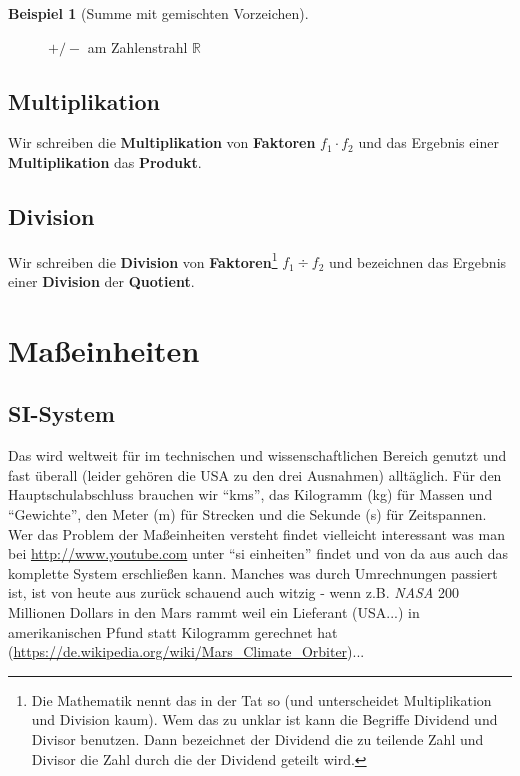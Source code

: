 \documentclass[a4paper]{book}%
\newcommand{\youtube}{\url{http://www.youtube.com}\xspace}
\theoremstyle{definition}
\newtheorem{beispiel}{Beispiel}
\begin{document}
\begin{beispiel}[Summe mit gemischten Vorzeichen]
\begin{figure}[H]
      \caption{$+/-$ am Zahlenstrahl $\mathbb{R}$}\label{fig:zahlenstrahlSumme01}
    \end{figure}
\end{beispiel}



\section{Multiplikation}

Wir schreiben die \textbf{Multiplikation} von \textbf{Faktoren} $f_1 \cdot f_2$ und das Ergebnis einer \textbf{Multiplikation} das \textbf{Produkt}.


\section{Division}

Wir schreiben die \textbf{Division} von \textbf{Faktoren}\footnote{Die Mathematik nennt das in der Tat so (und unterscheidet Multiplikation und Division kaum). Wem das zu unklar ist kann die Begriffe Dividend und Divisor benutzen. Dann bezeichnet der Dividend die zu teilende Zahl und Divisor die Zahl durch die der Dividend geteilt wird.} $f_1 \div f_2$ und bezeichnen das Ergebnis einer \textbf{Division} der \textbf{Quotient}.


\chapter{Maßeinheiten}

\section{SI-System}

Das  wird weltweit für im technischen und wissenschaftlichen Bereich genutzt und fast überall (leider gehören die USA zu den drei Ausnahmen) alltäglich. Für den Hauptschulabschluss brauchen wir \enquote{kms}, das Kilogramm (kg) für Massen und \enquote{Gewichte}, den Meter (m) für Strecken und die Sekunde (s) für Zeitspannen. Wer das Problem der Maßeinheiten versteht findet vielleicht interessant was man bei \youtube unter \enquote{si einheiten} findet und von da aus auch das komplette System erschließen kann. Manches was durch Umrechnungen passiert ist, ist von heute aus zurück schauend auch witzig - wenn z.B. \textit{NASA} 200 Millionen Dollars in den Mars rammt weil ein Lieferant (USA...) in amerikanischen Pfund statt Kilogramm gerechnet hat (\url{https://de.wikipedia.org/wiki/Mars_Climate_Orbiter})...
\end{document}
